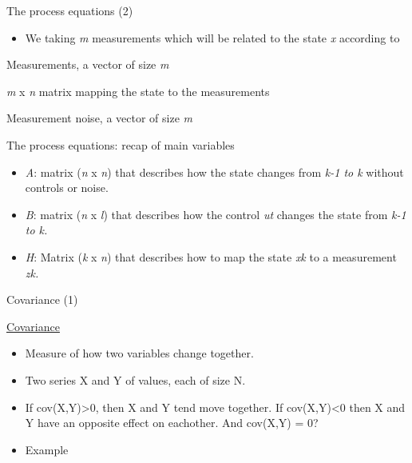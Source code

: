 \documentclass[compress]{beamer}
\providecommand{\tightlist}{%
  \setlength{\itemsep}{0pt}\setlength{\parskip}{0pt}}
\begin{document}
\begin{frame}{The process equations (2)}

\begin{itemize}
\tightlist
\item
  We taking \emph{m} measurements which will be related to the state
  \emph{x} according to
\end{itemize}

Measurements, a vector of size \emph{m}

\emph{m} x \emph{n} matrix mapping the state to the measurements

Measurement noise, a vector of size \emph{m}

\end{frame}

\begin{frame}{The process equations: recap of main variables}

\begin{itemize}
\tightlist
\item
  \emph{A}: matrix (\emph{n} x \emph{n}) that describes how the state
  changes from \emph{k-1 to k} without controls or noise.
\item
  \emph{B}: \emph{} matrix (\emph{n} x \emph{l}) that describes how the
  control \emph{ut} changes the state from \emph{k-1 to k.}
\item
  \emph{H}: Matrix (\emph{k} x \emph{n}) that describes how to map the
  state \emph{xk} to a measurement \emph{zk.}
\end{itemize}

\end{frame}

\begin{frame}{Covariance (1)}

\href{http://en.wikipedia.org/wiki/Covariance}{Covariance}

\begin{itemize}
\tightlist
\item
  Measure of how two variables change together.
\item
  Two series X and Y of values, each of size N.
\item
  If cov(X,Y)\textgreater{}0, then X and Y tend move together. If
  cov(X,Y)\textless{}0 then X and Y have an opposite effect on
  eachother. And cov(X,Y) = 0?
\item
  Example
\end{itemize}

\end{frame}
\end{document}
